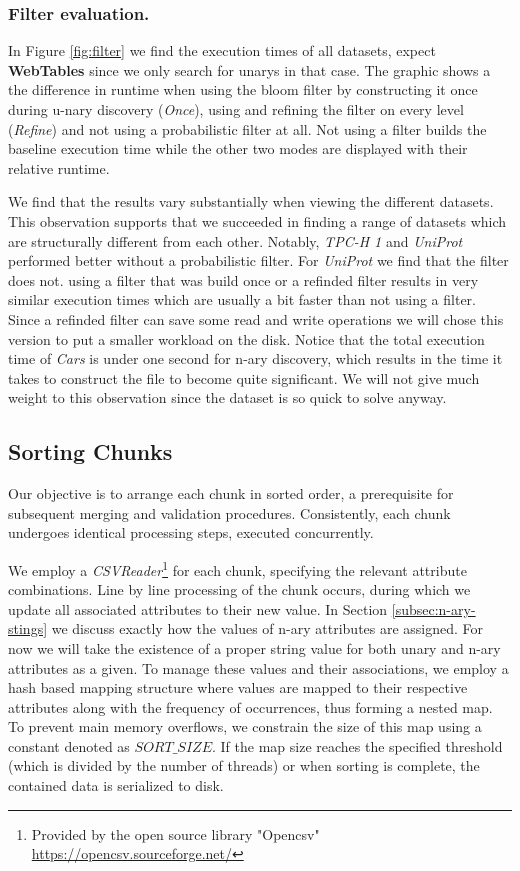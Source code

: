 \subsubsection{Filter evaluation.} In Figure \ref{fig:filter} we find the execution times of all datasets, expect \textbf{WebTables} since we only search for unarys in that case. The graphic shows a the difference in runtime when using the bloom filter by constructing it once during u-nary discovery (\textit{Once}), using and refining the filter on every level (\textit{Refine}) and not using a probabilistic filter at all. Not using a filter builds the baseline execution time while the other two modes are displayed with their relative runtime.

We find that the results vary substantially when viewing the different datasets. This observation supports that we succeeded in finding a range of datasets which are structurally different from each other. Notably, \textit{TPC-H 1} and \textit{UniProt} performed better without a probabilistic filter. For \textit{UniProt} we find that the filter does not. using a filter that was build once or a refinded filter results in very similar execution times which are usually a bit faster than not using a filter. Since a refinded filter can save some read and write operations we will chose this version to put a smaller workload on the disk. Notice that the total execution time of \textit{Cars} is under one second for n-ary discovery, which results in the time it takes to construct the file to become quite significant. We will not give much weight to this observation since the dataset is so quick to solve anyway.


\subsection{Sorting Chunks}
Our objective is to arrange each chunk in sorted order, a prerequisite for subsequent merging and validation procedures. Consistently, each chunk undergoes identical processing steps, executed concurrently.

We employ a \textit{CSVReader}\footnote{Provided by the open source library "Opencsv" \url{https://opencsv.sourceforge.net/}} for each chunk, specifying the relevant attribute combinations. Line by line processing of the chunk occurs, during which we update all associated attributes to their new value. In Section \ref{subsec:n-ary-stings} we discuss exactly how the values of n-ary attributes are assigned. For now we will take the existence of a proper string value for both unary and n-ary attributes as a given. To manage these values and their associations, we employ a hash based mapping structure where values are mapped to their respective attributes along with the frequency of occurrences, thus forming a nested map. To prevent main memory overflows, we constrain the size of this map using a constant denoted as $SORT\_SIZE$. If the map size reaches the specified threshold (which is divided by the number of threads) or when sorting is complete, the contained data is serialized to disk.

